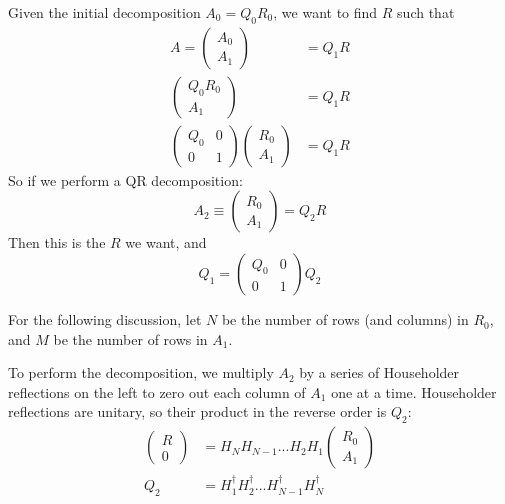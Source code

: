 \documentclass[twoside,letterpaper,11pt]{article}
\begin{document}
Given the initial decomposition $A_0 = Q_0 R_0$, we want to find $R$ such that
\begin{align*}
A = \left(\begin{array}{c}A_0 \\ A_1 \end{array}\right) &= Q_1 R \\
\left(\begin{array}{c}Q_0 R_0 \\ A_1 \end{array}\right) &= Q_1 R \\
\left(\begin{array}{cc}Q_0 & 0 \\ 0 & 1 \end{array}\right) 
\left(\begin{array}{c}R_0 \\ A_1 \end{array}\right) &= Q_1 R 
\end{align*}
So if we perform a QR decomposition: 
\begin{equation*}
A_2 \equiv \left(\begin{array}{c}R_0 \\ A_1 \end{array}\right) = Q_2 R 
\end{equation*}
Then this is the $R$ we want, and 
\begin{equation*}
Q_1 = \left(\begin{array}{cc}Q_0 & 0 \\ 0 & 1 \end{array}\right)  Q_2
\end{equation*}

For the following discussion, let $N$ be the number of rows (and columns) in $R_0$,
and $M$ be the number of rows in $A_1$.

To perform the decomposition, we multiply $A_2$ by a series of Householder reflections
on the left to zero out each column of $A_1$ one at a time.  Householder reflections 
are unitary, so their product in the reverse order is $Q_2$:
\begin{align*}
\left(\begin{array}{c}R \\ 0 \end{array}\right) &=
  H_N H_{N-1} ... H_2 H_1 
  \left(\begin{array}{c}R_0 \\ A_1 \end{array}\right)  \\
Q_2 &= H_1^\dagger H_2^\dagger ... H_{N-1}^\dagger H_N^\dagger 
\end{align*}
\end{document}
